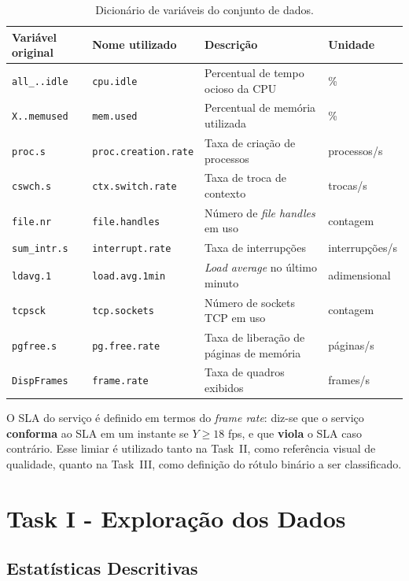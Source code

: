 \documentclass[11pt,a4paper]{article}
\begin{document}
\begin{table}[H]
\centering
\caption{Dicionário de variáveis do conjunto de dados.}
\label{tab:features}
\begin{tabular}{llll}
\toprule
Variável original & Nome utilizado & Descrição & Unidade \\
\midrule
\texttt{all\_..idle} & \texttt{cpu.idle} & Percentual de tempo ocioso da CPU & \% \\
\texttt{X..memused} & \texttt{mem.used} & Percentual de memória utilizada & \% \\
\texttt{proc.s} & \texttt{proc.creation.rate} & Taxa de criação de processos & processos/s \\
\texttt{cswch.s} & \texttt{ctx.switch.rate} & Taxa de troca de contexto & trocas/s \\
\texttt{file.nr} & \texttt{file.handles} & Número de \textit{file handles} em uso & contagem \\
\texttt{sum\_intr.s} & \texttt{interrupt.rate} & Taxa de interrupções & interrupções/s \\
\texttt{ldavg.1} & \texttt{load.avg.1min} & \textit{Load average} no último minuto & adimensional \\
\texttt{tcpsck} & \texttt{tcp.sockets} & Número de sockets TCP em uso & contagem \\
\texttt{pgfree.s} & \texttt{pg.free.rate} & Taxa de liberação de páginas de memória & páginas/s \\
\texttt{DispFrames} & \texttt{frame.rate} & Taxa de quadros exibidos & frames/s \\
\bottomrule
\end{tabular}
\end{table}

O SLA do serviço é definido em termos do \emph{frame rate}: diz-se que o serviço \textbf{conforma} ao SLA em um instante se $Y \geq 18$ fps, e que \textbf{viola} o SLA caso contrário. Esse limiar é utilizado tanto na Task~II, como referência visual de qualidade, quanto na Task~III, como definição do rótulo binário a ser classificado.


\section{Task I - Exploração dos Dados}
\label{sec:taskI}


\subsection{Estatísticas Descritivas}
\end{document}
